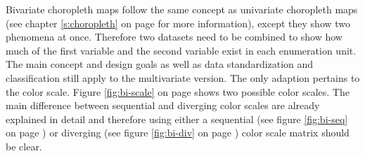Bivariate choropleth maps follow the same concept as univariate choropleth maps (see chapter \ref{s:choropleth} on page \pageref{s:choropleth} for more information), except they show two phenomena at once. Therefore two datasets need to be combined to show how much of the first variable and the second variable exist in each enumeration unit. The main concept and design goals as well as data standardization and classification still apply to the multivariate version. The only adaption pertains to the color scale. Figure \ref{fig:bi-scale} on page \pageref{fig:bi-scale} shows two possible color scales. The main difference between sequential and diverging color scales are already explained in detail and therefore using either a sequential (see figure \ref{fig:bi-seq} on page \pageref{fig:bi-seq}) or diverging (see figure \ref{fig:bi-div} on page \pageref{fig:bi-div}) color scale matrix should be clear.


